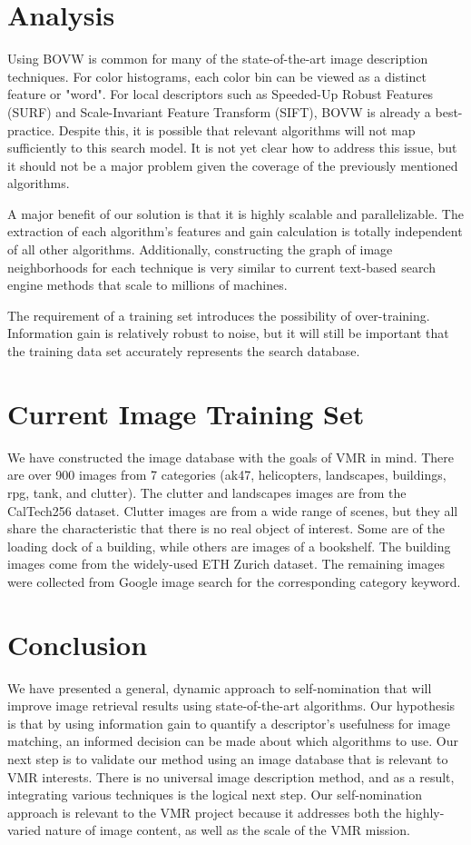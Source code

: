 \documentclass[12pt]{article}
\begin{document}
\section{Analysis}
Using BOVW is common for many of the state-of-the-art image description techniques.\cite{Bay2008} For color histograms, each color bin can be viewed as a distinct feature or "word". For local descriptors such as Speeded-Up Robust Features (SURF) and Scale-Invariant Feature Transform (SIFT), BOVW is already a best-practice. Despite this, it is possible that relevant algorithms will not map sufficiently to this search model. It is not yet clear how to address this issue, but it should not be a major problem given the coverage of the previously mentioned algorithms.

A major benefit of our solution is that it is highly scalable and parallelizable. The extraction of each algorithm's features and gain calculation is totally independent of all other algorithms. Additionally, constructing the graph of image neighborhoods for each technique is very similar to current text-based search engine methods that scale to millions of machines.

The requirement of a training set introduces the possibility of over-training. Information gain is relatively robust to noise, but it will still be important that the training data set accurately represents the search database.

\section{Current Image Training Set}
We have constructed the image database with the goals of VMR in mind. There are over 900 images from 7 categories (ak47, helicopters, landscapes, buildings, rpg, tank, and clutter). The clutter and landscapes images are from the CalTech256 dataset. Clutter images are from a wide range of scenes, but they all share the characteristic that there is no real object of interest. Some are of the loading dock of a building, while others are images of a bookshelf. The building images come from the widely-used ETH Zurich dataset. The remaining images were collected from Google image search for the corresponding category keyword.

\section{Conclusion}
We have presented a general, dynamic approach to self-nomination that will improve image retrieval results using state-of-the-art algorithms. Our hypothesis is that by using information gain to quantify a descriptor's usefulness for image matching, an informed decision can be made about which algorithms to use. Our next step is to validate our method using an image database that is relevant to VMR interests. There is no universal image description method, and as a result, integrating various techniques is the logical next step. Our self-nomination approach is relevant to the VMR project because it addresses both the highly-varied nature of image content, as well as the scale of the VMR mission.



\end{document}
